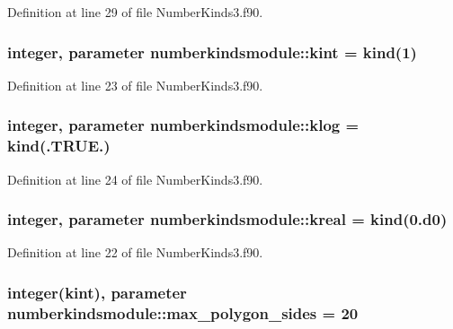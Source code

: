Definition at line 29 of file Number\+Kinds3.\+f90.

\hypertarget{classnumberkindsmodule_a50957e2e9ebdf9a5c6da0641adf3a1b3}{
\subsubsection[{kint}]{\setlength{\rightskip}{0pt plus 5cm}integer, parameter numberkindsmodule\+::kint = kind(1)}}\label{classnumberkindsmodule_a50957e2e9ebdf9a5c6da0641adf3a1b3}


Definition at line 23 of file Number\+Kinds3.\+f90.

\hypertarget{classnumberkindsmodule_a4e700e028ecf89d8d338fb96bf5d2ee8}{
\subsubsection[{klog}]{\setlength{\rightskip}{0pt plus 5cm}integer, parameter numberkindsmodule\+::klog = kind(.T\+R\+U\+E.)}}\label{classnumberkindsmodule_a4e700e028ecf89d8d338fb96bf5d2ee8}


Definition at line 24 of file Number\+Kinds3.\+f90.

\hypertarget{classnumberkindsmodule_acb7e3fe921df90acbc66762b69413be6}{
\subsubsection[{kreal}]{\setlength{\rightskip}{0pt plus 5cm}integer, parameter numberkindsmodule\+::kreal = kind(0.d0)}}\label{classnumberkindsmodule_acb7e3fe921df90acbc66762b69413be6}


Definition at line 22 of file Number\+Kinds3.\+f90.

\hypertarget{classnumberkindsmodule_aee005c7ee017fa4369247b38c1fea7ba}{
\subsubsection[{max\+\_\+polygon\+\_\+sides}]{\setlength{\rightskip}{0pt plus 5cm}integer({\bf kint}), parameter numberkindsmodule\+::max\+\_\+polygon\+\_\+sides = 20}}\label{classnumberkindsmodule_aee005c7ee017fa4369247b38c1fea7ba}


